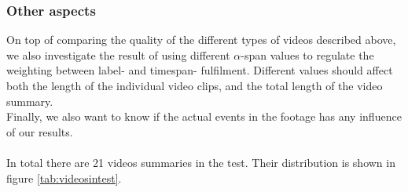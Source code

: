 \subsubsection{Other aspects}
%
On top of comparing the quality of the different types of videos described above, we also investigate the result of using different $\alpha$-span values to regulate the weighting between label- and timespan- fulfilment. Different values should affect both the length of the individual video clips, and the total length of the video summary.\\
Finally, we also want to know if the actual events in the footage has any influence of our results.\\\\
%
In total there are 21 videos summaries in the test. Their distribution is shown in figure \ref{tab:videosintest}.
%
